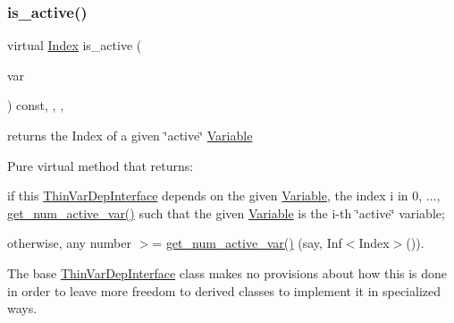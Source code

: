 \mbox{\label{class_s_m_spp__di__unipi__it_1_1_linear_function_a11ab803d076414aa34a02d03a4f6db4d}} 
\subsubsection{\texorpdfstring{is\+\_\+active()}{is\_active()}}
{\footnotesize\ttfamily virtual \mbox{\hyperlink{group___thin_var_dep_interface___c_l_a_s_s_e_s_gad53d6229d7ec28555a9c9c2fd9abf773}{Index}} is\+\_\+active (\begin{DoxyParamCaption}\item[{const \mbox{\hyperlink{class_s_m_spp__di__unipi__it_1_1_variable}{Variable}} $\ast$const}]{var }\end{DoxyParamCaption}) const\hspace{0.3cm}{\ttfamily [inline]}, {\ttfamily [final]}, {\ttfamily [override]}, {\ttfamily [virtual]}}



returns the Index of a given \char`\"{}active\char`\"{} \mbox{\hyperlink{class_s_m_spp__di__unipi__it_1_1_variable}{Variable}} 

Pure virtual method that returns\+:


\begin{DoxyItemize}
\item if this \mbox{\hyperlink{class_s_m_spp__di__unipi__it_1_1_thin_var_dep_interface}{Thin\+Var\+Dep\+Interface}} depends on the given \mbox{\hyperlink{class_s_m_spp__di__unipi__it_1_1_variable}{Variable}}, the index i in 0, ..., \mbox{\hyperlink{class_s_m_spp__di__unipi__it_1_1_linear_function_a9e4e36559af1c5c8ecac72598b9fea4c}{get\+\_\+num\+\_\+active\+\_\+var()}} such that the given \mbox{\hyperlink{class_s_m_spp__di__unipi__it_1_1_variable}{Variable}} is the i-\/th \char`\"{}active\char`\"{} variable;
\item otherwise, any number $>$= \mbox{\hyperlink{class_s_m_spp__di__unipi__it_1_1_linear_function_a9e4e36559af1c5c8ecac72598b9fea4c}{get\+\_\+num\+\_\+active\+\_\+var()}} (say, Inf$<$\+Index$>$()).
\end{DoxyItemize}

The base \mbox{\hyperlink{class_s_m_spp__di__unipi__it_1_1_thin_var_dep_interface}{Thin\+Var\+Dep\+Interface}} class makes no provisions about how this is done in order to leave more freedom to derived classes to implement it in specialized ways. 

